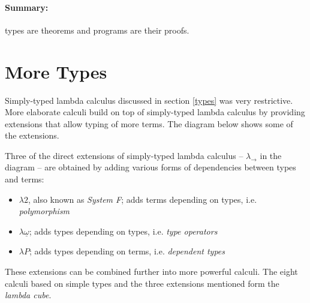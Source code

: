 \documentclass[11pt,twoside,a4paper]{article} %
\begin{document}
\paragraph{Summary:} types are theorems and programs are their proofs.

\section{More Types}

Simply-typed lambda calculus discussed in section \ref{types} was very restrictive. More 
elaborate calculi build on top of simply-typed lambda calculus by providing
extensions that allow typing of more terms. The diagram below shows some of the 
extensions.
\begin{center}
\end{center}
Three of the direct extensions of simply-typed lambda calculus -- $\lambda_\rightarrow$ in the
diagram -- are obtained by adding various forms of dependencies between types
and terms:
\begin{itemize}
\item $\lambda 2$, also known as \emph{System F}; adds terms depending on
types, i.e. \emph{polymorphism}
\item $\lambda\underline{\omega}$; adds types depending on types, i.e. \emph{type
operators}
\item $\lambda P$; adds types depending on terms, i.e. \emph{dependent types}
\end{itemize}
These extensions can be combined further into more powerful calculi. The eight
calculi based on simple types and the three extensions mentioned form the
\emph{lambda cube}\cite{b91}.
\end{document}
